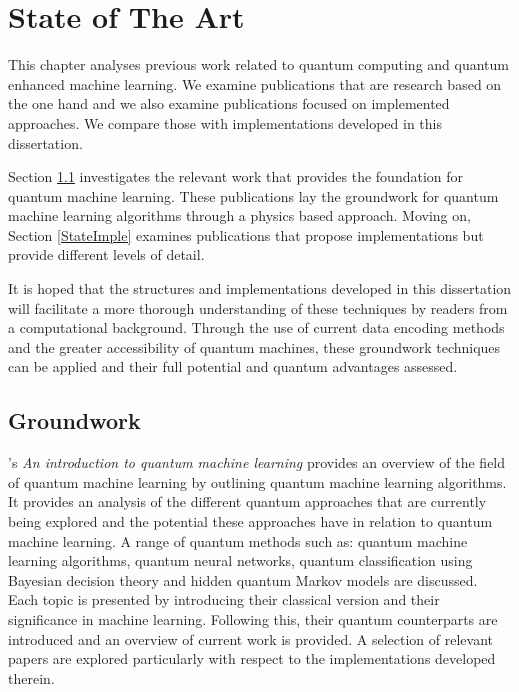 \chapter{State of The Art}\label{StateOArt}
This chapter analyses previous work related to quantum computing and quantum enhanced machine learning. We examine publications that are research based on the one hand and we also examine publications focused on implemented approaches. We compare those with implementations developed in this dissertation. 

Section \ref{GroundState} investigates the relevant work that provides the foundation for quantum machine learning. These publications lay the groundwork for quantum machine learning algorithms through a physics based approach. Moving on, Section \ref{StateImple} examines publications that propose implementations but provide different levels of detail. %
 
 It is hoped that the structures and implementations developed in this dissertation will facilitate a more thorough understanding of these techniques by readers from a computational background. Through the use of current data encoding methods and the greater accessibility of quantum machines, these groundwork techniques can be applied and their full potential and quantum advantages assessed. %

\section{Groundwork}\label{GroundState}
\citep{research1}'s \emph{An introduction to quantum machine learning} provides an overview of the field of quantum machine learning by outlining quantum machine learning algorithms. It provides an analysis of the different quantum approaches that are currently being explored and the potential these approaches have in relation to quantum machine learning. A range of quantum methods such as: quantum machine learning algorithms, quantum neural networks, quantum classification using Bayesian decision theory and hidden quantum Markov models are discussed. Each topic is presented by introducing their classical version and their significance in machine learning. Following this, their quantum counterparts are introduced and an overview of current work is provided. A selection of relevant papers are explored particularly with respect to the implementations developed therein.


